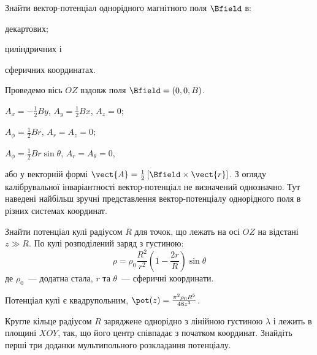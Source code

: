 
\begin{problem}
Знайти вектор-потенціал однорідного магнітного поля $\Bfield$ в:
\begin{enumerate*}[label=\alph*)]
	\item декартових;
	\item циліндричних і
	\item сферичних координатах.
\end{enumerate*}
\begin{solution}
	Проведемо вісь $OZ$ вздовж поля $\Bfield = (0, 0, B)$.
	\begin{enumerate*}[label=\alph*)]
		\item $A_x = -\frac12 By$, $A_y = \frac12 Bx$, $A_z = 0$;
		\item $A_{\phi} = \frac12 Br$, $A_r = A_z = 0$;
		\item $A_{\phi} = \frac12 Br\sin\theta$, $A_r = A_{\theta} = 0$,
	\end{enumerate*}
або у векторній формі 	$\vect{A} = \frac12 \left[ \Bfield\times \vect{r} \right] $.
	З огляду калібрувальної інваріантності вектор-потенціал не визначений однозначно. Тут наведені найбільш зручні представлення вектор-потенціалу однорідного поля в різних системах координат.
\end{solution}
\end{problem}

\begin{problem}%
Знайти потенціал кулі радіусом $R$ для точок, що лежать на осі $OZ$ на відстані $z \gg R$. По кулі розподілений заряд з густиною:
\[
	\rho = \rho_0 \frac{R^2}{r^2}\left( 1 - \frac{2r}{R}\right)\sin\theta
\]
де $\rho_0$~--- додатна стала, $r$ та $\theta$~--- сферичні координати.
\begin{solution}
	Потенціал кулі є квадрупольним, $\pot(z) = \frac{\pi^2\rho_0 R^5}{48z^3}$.
\end{solution}
\end{problem}

\begin{problem}%
Кругле кільце радіусом $R$ заряджене однорідно з лінійною густиною $\lambda$ і лежить в площині $XOY$, так, що його центр співпадає з початком координат. Знайдіть перші три доданки мультипольного розкладання потенціалу.
\end{problem}

